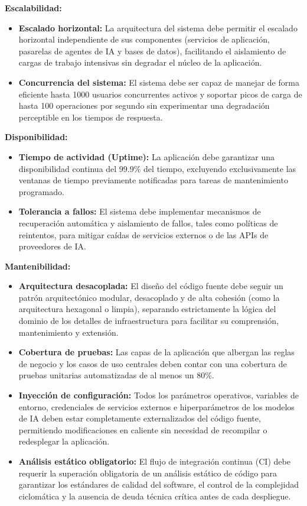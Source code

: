 \textbf{Escalabilidad:}
\begin{itemize}
    \item \textbf{Escalado horizontal:} La arquitectura del sistema debe permitir el escalado horizontal independiente de sus componentes (servicios de aplicación, pasarelas de agentes de \ac{IA} y bases de datos), facilitando el aislamiento de cargas de trabajo intensivas sin degradar el núcleo de la aplicación.
    \item \textbf{Concurrencia del sistema:} El sistema debe ser capaz de manejar de forma eficiente hasta 1000 usuarios concurrentes activos y soportar picos de carga de hasta 100 operaciones por segundo sin experimentar una degradación perceptible en los tiempos de respuesta.
\end{itemize}

\textbf{Disponibilidad:}
\begin{itemize}
    \item \textbf{Tiempo de actividad (Uptime):} La aplicación debe garantizar una disponibilidad continua del 99.9\% del tiempo, excluyendo exclusivamente las ventanas de tiempo previamente notificadas para tareas de mantenimiento programado.
    \item \textbf{Tolerancia a fallos:} El sistema debe implementar mecanismos de recuperación automática y aislamiento de fallos, tales como políticas de reintentos, para mitigar caídas de servicios externos o de las APIs de proveedores de \ac{IA}.
\end{itemize}

\textbf{Mantenibilidad:}
\begin{itemize}
    \item \textbf{Arquitectura desacoplada:} El diseño del código fuente debe seguir un patrón arquitectónico modular, desacoplado y de alta cohesión (como la arquitectura hexagonal o limpia\cite{martin2017clean}), separando estrictamente la lógica del dominio de los detalles de infraestructura para facilitar su comprensión, mantenimiento y extensión.
    \item \textbf{Cobertura de pruebas:} Las capas de la aplicación que albergan las reglas de negocio y los casos de uso centrales deben contar con una cobertura de pruebas unitarias automatizadas de al menos un 80\%.
    \item \textbf{Inyección de configuración:} Todos los parámetros operativos, variables de entorno, credenciales de servicios externos e hiperparámetros de los modelos de \ac{IA} deben estar completamente externalizados del código fuente, permitiendo modificaciones en caliente sin necesidad de recompilar o redesplegar la aplicación.
    \item \textbf{Análisis estático obligatorio:} El flujo de integración continua (\ac{CI}) debe requerir la superación obligatoria de un análisis estático de código para garantizar los estándares de calidad del software, el control de la complejidad ciclomática y la ausencia de deuda técnica crítica antes de cada despliegue.
\end{itemize}

